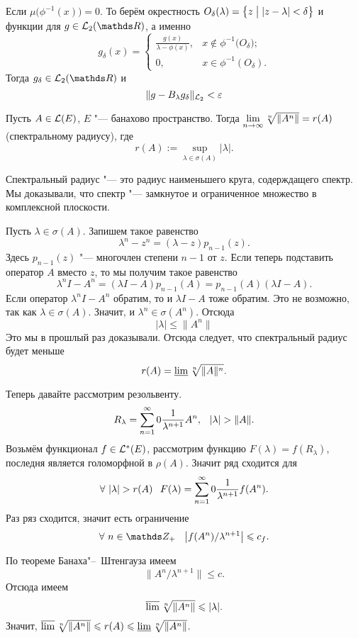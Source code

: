 Если $\mu\big(\phi^{-1}(x)\big)=0$. То берём окрестность $O_\delta(\lambda) = \big\{z\bigm| |z-\lambda|<\delta\big\}$ и функции для $g\in\L_2(\R)$, а именно
\[
  g_\delta(x) = 
\begin{cases}
  \frac{g(x)}{\lambda-\phi(x)},&x\not\in \phi^{-1}\big(O_\delta\big);\\
  0,& x \in\phi^{-1}(O_\delta).
\end{cases}
\]
Тогда  $g_\delta\in\L_2(\R)$ и 
\[
  \|g - B_\lambda g_\delta\|_{\L_2} <\e
\]

\begin{The}
  Пусть $A\in \L(E)$, $E$ "--- банахово пространство. Тогда $\yo n\infty \sqrt[n]{\|A^n\|} = r(A)$ (спектральному радиусу), где 
\[
  r(A) := \sup\limits_{\lambda\in\sigma(A)}|\lambda|.
\]
\end{The}
Спектральный радиус "--- это радиус наименьшего круга, содерждащего спектр. Мы доказывали, что спектр "--- замкнутое и ограниченное множество в комплексной плоскости.

\begin{Proof}
Пусть $\lambda\in\sigma(A)$. Запишем такое равенство
\[
 \lambda^n - z^n = (\lambda-z) p_{n-1}(z).
\]
Здесь $p_{n-1}(z)$ "--- многочлен степени $n-1$ от $z$. Если теперь подставить оператор $A$ вместо $z$, то мы получим такое равенство
\[
  \lambda^n I - A^n = (\lambda I- A)p_{n-1}(A) = p_{n-1}(A) (\lambda I - A).
\]
Если оператор $\lambda^n I - A^n$ обратим, то и $\lambda I - A$ тоже обратим. Это не возможно, так как $\lambda\in\sigma(A)$. Значит, и $\lambda^n\in \sigma(A^n)$. Отсюда
\[
  |\lambda|\le \|A^n\|
\]
Это мы в прошлый раз доказывали. Отсюда следует, что спектральный радиус будет меньше
\[
  r(A) = \varliminf \sqrt[n]{\|A\|^n}.
\]

Теперь давайте рассмотрим резольвенту.
\[
  R_\lambda = \rY n0 \frac1{\lambda^{n+1}} A^n,\pau |\lambda|>\|A\|.
\]
Возьмём функционал $f\in \L^*(E)$, рассмотрим функцию $F(\lambda) = f(R_\lambda)$, последня  является голоморфной в $\rho(A)$. Значит ряд сходится для
\[
  \forall\ |\lambda|>r(A)\pau 
  F(\lambda) = \rY n0\frac1{\lambda^{n+1}} f(A^n).
\]
Раз ряз сходится, значит есть ограничение
\[
  \forall\ n\in \Z_+\pau \left|f(A^n)/\lambda^{n+1}\right|\le c_f.
\]

По теореме Банаха"--~Штенгауза имеем
\[
  \|A^n/\lambda^{n+1}\|\le c.
\]
Отсюда имеем
\[
  \varlimsup\sqrt[n]{\|A^n\|}\le |\lambda|.
\]
Значит, $\varlimsup\sqrt[n]{\|A^n\|}\le r(A)\le \varliminf\sqrt[n]{\|A^n\|}$.
\end{Proof}

